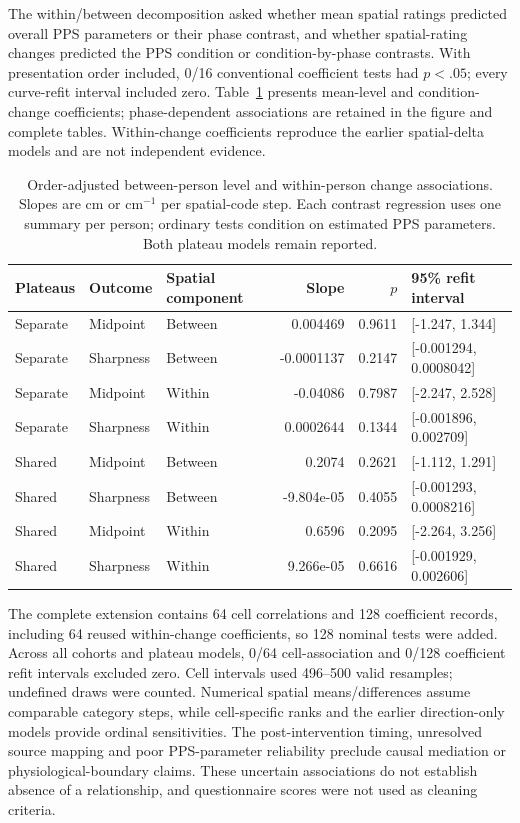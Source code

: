 The within/between decomposition asked whether mean spatial ratings predicted overall PPS parameters or their phase contrast, and whether spatial-rating changes predicted the PPS condition or condition-by-phase contrasts. With presentation order included, 0/16 conventional coefficient tests had $p<.05$; every curve-refit interval included zero. Table~\ref{study5:tab:spatial_pps_models} presents mean-level and condition-change coefficients; phase-dependent associations are retained in the figure and complete tables. Within-change coefficients reproduce the earlier spatial-delta models and are not independent evidence.

\begin{table}[htbp]
\centering\small
\begin{tabular}{lllrrl}
Plateaus & Outcome & Spatial component & Slope & $p$ & 95\% refit interval \\
\hline
Separate & Midpoint & Between & 0.004469 & 0.9611 & [-1.247, 1.344] \\
Separate & Sharpness & Between & -0.0001137 & 0.2147 & [-0.001294, 0.0008042] \\
Separate & Midpoint & Within & -0.04086 & 0.7987 & [-2.247, 2.528] \\
Separate & Sharpness & Within & 0.0002644 & 0.1344 & [-0.001896, 0.002709] \\
Shared & Midpoint & Between & 0.2074 & 0.2621 & [-1.112, 1.291] \\
Shared & Sharpness & Between & -9.804e-05 & 0.4055 & [-0.001293, 0.0008216] \\
Shared & Midpoint & Within & 0.6596 & 0.2095 & [-2.264, 3.256] \\
Shared & Sharpness & Within & 9.266e-05 & 0.6616 & [-0.001929, 0.002606] \\
\end{tabular}
\caption{Order-adjusted between-person level and within-person change associations. Slopes are cm or cm$^{-1}$ per spatial-code step. Each contrast regression uses one summary per person; ordinary tests condition on estimated PPS parameters. Both plateau models remain reported.}
\label{study5:tab:spatial_pps_models}
\end{table}

The complete extension contains 64 cell correlations and 128 coefficient records, including 64 reused within-change coefficients, so 128 nominal tests were added. Across all cohorts and plateau models, 0/64 cell-association and 0/128 coefficient refit intervals excluded zero. Cell intervals used 496--500 valid resamples; undefined draws were counted. Numerical spatial means/differences assume comparable category steps, while cell-specific ranks and the earlier direction-only models provide ordinal sensitivities. The post-intervention timing, unresolved source mapping and poor PPS-parameter reliability preclude causal mediation or physiological-boundary claims. These uncertain associations do not establish absence of a relationship, and questionnaire scores were not used as cleaning criteria.

